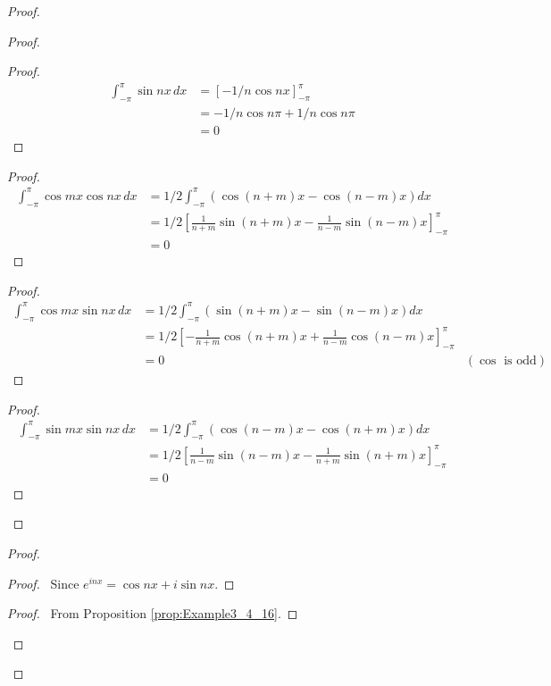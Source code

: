 \documentclass{book}
\let\qed\relax
\theoremstyle{definition}
\begin{document}
\begin{proof}
\begin{proof}
\begin{proof}
		\pf
		\begin{align*}
			\int_{-\pi}^\pi \sin nx \, dx
			& = \left[ -1/n \cos nx \right]_{-\pi}^\pi \\
			& = -1/n \cos n \pi + 1/n \cos n \pi \\
			& = 0
		\end{align*}
	\end{proof}
	\begin{proof}
		\pf
		\begin{align*}
			\int_{-\pi}^\pi \cos mx \cos nx \, dx
			& = 1/2 \int_{-\pi}^\pi (\cos(n+m)x - \cos (n-m) x) dx \\
			& = 1/2 \left[ \frac{1}{n+m} \sin (n+m) x - \frac{1}{n-m} \sin (n-m)x \right]_{-\pi}^\pi \\
			& = 0
		\end{align*}
	\end{proof}
	\begin{proof}
		\pf
		\begin{align*}
			\int_{-\pi}^\pi \cos mx \sin nx \, dx
			& = 1/2 \int_{-\pi}^\pi (\sin (n+m)x - \sin(n-m)x) dx \\
			& = 1/2 \left[ - \frac{1}{n+m} \cos (n+m)x + \frac{1}{n-m} \cos (n-m)x \right]_{-\pi}^\pi \\
			& = 0 & (\cos \text{ is odd})
		\end{align*}
	\end{proof}
	\begin{proof}
		\pf
		\begin{align*}
			\int_{-\pi}^\pi \sin mx \sin nx \, dx
			& = 1/2 \int_{-\pi}^\pi (\cos (n-m)x - \cos (n+m)x) dx \\
			& = 1/2 \left[\frac{1}{n-m} \sin(n-m)x - \frac{1}{n+m} \sin(n+m)x \right]_{-\pi}^\pi \\
			& = 0
		\end{align*}
	\end{proof}
\end{proof}
\begin{proof}
	\begin{proof}
		\pf\ Since $e^{inx} = \cos nx + i \sin nx$.
	\end{proof}
	\begin{proof}
		\pf\ From Proposition \ref{prop:Example3_4_16}.
	\end{proof}
\end{proof}
\qed
\end{proof}
\end{document}
